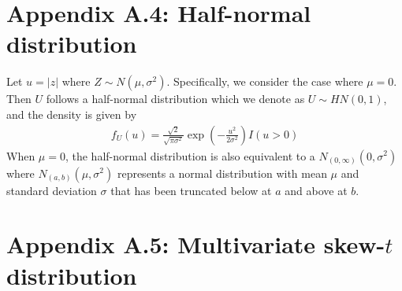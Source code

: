 \documentclass[11pt]{article}
\begin{document}
\section*{Appendix A.4: Half-normal distribution}
Let $u = |z|$ where $Z \sim N(\mu, \sigma^2)$.
Specifically, we consider the case where $\mu = 0$. Then $U$ follows a half-normal distribution which we denote as $U \sim HN(0, 1)$, and the density is given by
\begin{align}
  f_U(u) = \frac{ \sqrt{2} }{ \sqrt{\pi \sigma^2} } \exp \left( - \frac{ u^2 }{ 2 \sigma^2 } \right) I(u > 0)
\end{align}
When $\mu = 0$, the half-normal distribution is also equivalent to a $N_{(0, \infty)}(0, \sigma^2)$ where $N_{(a, b)}(\mu, \sigma^2)$ represents a normal distribution with mean $\mu$ and standard deviation $\sigma$ that has been truncated below at $a$ and above at $b$.

\section*{Appendix A.5: Multivariate skew-$t$ distribution}




\end{document}
